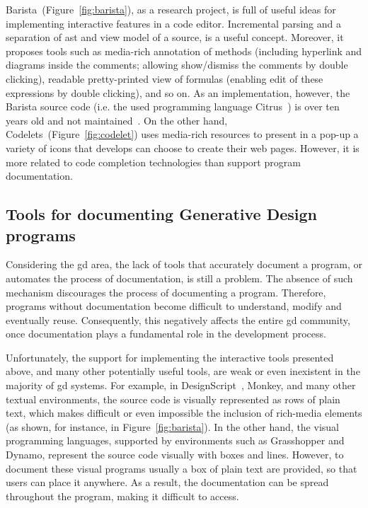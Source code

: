 Barista~(Figure~\ref{fig:barista}), as a research project, is full of useful ideas for implementing interactive features in a code editor. Incremental parsing and a separation of \gls{ast} and view model of a source, is a useful concept. Moreover, it proposes tools such as media-rich annotation of methods (including hyperlink and diagrams inside the comments; allowing show/dismiss the comments by double clicking), readable pretty-printed view of formulas (enabling edit of these expressions by double clicking), and so on. As an implementation, however, the Barista source code (i.e. the used programming language Citrus~\citep{ko2005citrus}) is over ten years old and not maintained~\citep{contact:ko2006barista}. On the other hand, Codelets~(Figure~\ref{fig:codelet}) uses media-rich resources to present in a pop-up a variety of icons that develops can choose to create their web pages. However, it is more related to code completion technologies than support program documentation.

\subsection{Tools for documenting Generative Design programs}
\label{subsec:gdprograms}

Considering the \gls{gd} area, the lack of tools that accurately document a program, or automates the process of documentation, is still a problem. The absence of such mechanism discourages the process of documenting a program. Therefore, programs without documentation become difficult to understand, modify and eventually reuse. Consequently, this negatively affects the entire \gls{gd} community, once documentation plays a fundamental role in the development process. 

Unfortunately, the support for implementing the interactive tools presented above, and many other potentially useful tools, are weak or even inexistent in the majority of \gls{gd} systems. For example, in DesignScript~\citep{aish2012designscript}, Monkey, and many other textual environments, the source code is visually represented as rows of plain text, which makes difficult or even impossible the inclusion of rich-media elements (as shown, for instance, in Figure~\ref{fig:barista}). In the other hand, the visual programming languages, supported by environments such as Grasshopper and Dynamo, represent the source code visually with boxes and lines. However, to document these visual programs usually a box of plain text are provided, so that users can place it anywhere. As a result, the documentation can be spread throughout the program, making it difficult to access.

